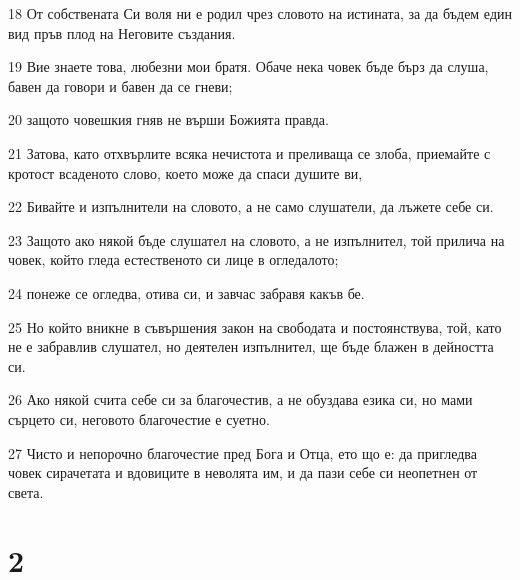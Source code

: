 \par 18 От собствената Си воля ни е родил чрез словото на истината, за да бъдем един вид пръв плод на Неговите създания.
\par 19 Вие знаете това, любезни мои братя. Обаче нека човек бъде бърз да слуша, бавен да говори и бавен да се гневи;
\par 20 защото човешкия гняв не върши Божията правда.
\par 21 Затова, като отхвърлите всяка нечистота и преливаща се злоба, приемайте с кротост всаденото слово, което може да спаси душите ви,
\par 22 Бивайте и изпълнители на словото, а не само слушатели, да лъжете себе си.
\par 23 Защото ако някой бъде слушател на словото, а не изпълнител, той прилича на човек, който гледа естественото си лице в огледалото;
\par 24 понеже се огледва, отива си, и завчас забравя какъв бе.
\par 25 Но който вникне в съвършения закон на свободата и постоянствува, той, като не е забравлив слушател, но деятелен изпълнител, ще бъде блажен в дейността си.
\par 26 Ако някой счита себе си за благочестив, а не обуздава езика си, но мами сърцето си, неговото благочестие е суетно.
\par 27 Чисто и непорочно благочестие пред Бога и Отца, ето що е: да пригледва човек сирачетата и вдовиците в неволята им, и да пази себе си неопетнен от света.

\chapter{2}

